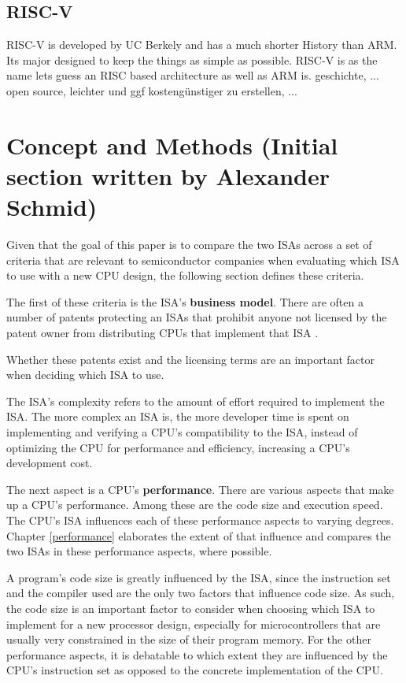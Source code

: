 \documentclass[conference]{IEEEtran}
\begin{document}
	\subsection{RISC-V}
	RISC-V is developed by UC Berkely and has a much shorter History than ARM. Its major designed to keep the things as simple as possible. RISC-V is as the name lets guess an \gls{RISC} based architecture as well as ARM is. 
	geschichte, ...
	open source, leichter und ggf kostengünstiger zu erstellen, ...

\section{Concept and Methods (Initial section written by Alexander Schmid)}
\label{ref:concept}

Given that the goal of this paper is to compare the two \glspl{ISA}
across a set of criteria that are relevant to semiconductor companies when evaluating which \gls{ISA} to use with a new CPU design,
the following section defines these criteria.

The first of these criteria is the \gls{ISA}'s \textbf{business model}. There are often a number of patents protecting an \glspl{ISA} that prohibit anyone not licensed
by the patent owner from distributing \glspl{CPU} that implement that \gls{ISA} \cite{Tang2011}.

Whether these patents exist and the licensing terms
are an important factor when deciding which \gls{ISA} to use.

The \gls{ISA}'s complexity refers to the amount of effort required to implement the \gls{ISA}. The more complex an \gls{ISA} is, the more developer
time is spent on implementing and verifying a \gls{CPU}'s compatibility to the \gls{ISA}, instead of optimizing the \gls{CPU} for performance and efficiency,
increasing a \gls{CPU}'s development cost. \cite{Patterson1980}

The next aspect is a \gls{CPU}'s \textbf{performance}. There are various aspects that make up a \gls{CPU}'s performance.
Among these are the code size and execution speed.
The \gls{CPU}'s \gls{ISA} influences each of these performance aspects to varying degrees. Chapter \ref{performance} elaborates
the extent of that influence and compares the two \glspl{ISA} in these performance aspects, where possible.

A program's code size is greatly influenced by the \gls{ISA}, since the instruction set and the compiler used are the only two factors that influence
code size. As such, the code size is an important factor to consider when choosing which \gls{ISA} to implement for a new processor design, especially
for microcontrollers that are usually very constrained in the size of their program memory.
For the other performance aspects, it is debatable to which extent they are influenced by the \gls{CPU}'s instruction set as opposed
to the concrete implementation of the CPU. \cite{Blem2013} \cite{Akram2017}
\end{document}
